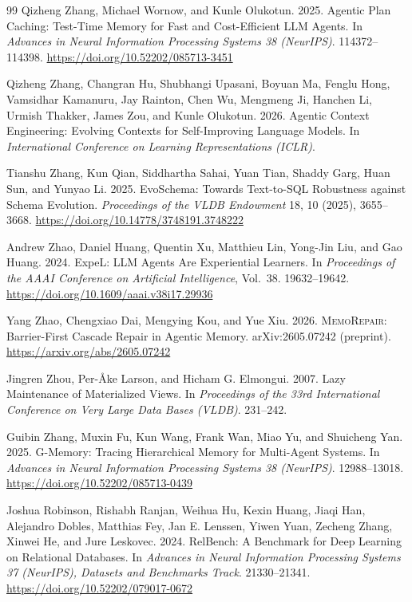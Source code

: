 \begin{thebibliography}{99}
Qizheng Zhang, Michael Wornow, and Kunle Olukotun. 2025. Agentic Plan Caching: Test-Time Memory for Fast and Cost-Efficient LLM Agents. In \emph{Advances in Neural Information Processing Systems 38 (NeurIPS)}. 114372--114398. \url{https://doi.org/10.52202/085713-3451}

Qizheng Zhang, Changran Hu, Shubhangi Upasani, Boyuan Ma, Fenglu Hong, Vamsidhar Kamanuru, Jay Rainton, Chen Wu, Mengmeng Ji, Hanchen Li, Urmish Thakker, James Zou, and Kunle Olukotun. 2026. Agentic Context Engineering: Evolving Contexts for Self-Improving Language Models. In \emph{International Conference on Learning Representations (ICLR)}.

Tianshu Zhang, Kun Qian, Siddhartha Sahai, Yuan Tian, Shaddy Garg, Huan Sun, and Yunyao Li. 2025. EvoSchema: Towards Text-to-SQL Robustness against Schema Evolution. \emph{Proceedings of the VLDB Endowment} 18, 10 (2025), 3655--3668. \url{https://doi.org/10.14778/3748191.3748222}

Andrew Zhao, Daniel Huang, Quentin Xu, Matthieu Lin, Yong-Jin Liu, and Gao Huang. 2024. ExpeL: LLM Agents Are Experiential Learners. In \emph{Proceedings of the AAAI Conference on Artificial Intelligence}, Vol.~38. 19632--19642. \url{https://doi.org/10.1609/aaai.v38i17.29936}

Yang Zhao, Chengxiao Dai, Mengying Kou, and Yue Xiu. 2026. \textsc{MemoRepair}: Barrier-First Cascade Repair in Agentic Memory. arXiv:2605.07242 (preprint). \url{https://arxiv.org/abs/2605.07242}

Jingren Zhou, Per-{\AA}ke Larson, and Hicham G. Elmongui. 2007. Lazy Maintenance of Materialized Views. In \emph{Proceedings of the 33rd International Conference on Very Large Data Bases (VLDB)}. 231--242.

Guibin Zhang, Muxin Fu, Kun Wang, Frank Wan, Miao Yu, and Shuicheng Yan. 2025. G-Memory: Tracing Hierarchical Memory for Multi-Agent Systems. In \emph{Advances in Neural Information Processing Systems 38 (NeurIPS)}. 12988--13018. \url{https://doi.org/10.52202/085713-0439}

Joshua Robinson, Rishabh Ranjan, Weihua Hu, Kexin Huang, Jiaqi Han, Alejandro Dobles, Matthias Fey, Jan E. Lenssen, Yiwen Yuan, Zecheng Zhang, Xinwei He, and Jure Leskovec. 2024. RelBench: A Benchmark for Deep Learning on Relational Databases. In \emph{Advances in Neural Information Processing Systems 37 (NeurIPS), Datasets and Benchmarks Track}. 21330--21341. \url{https://doi.org/10.52202/079017-0672}


\end{thebibliography}
